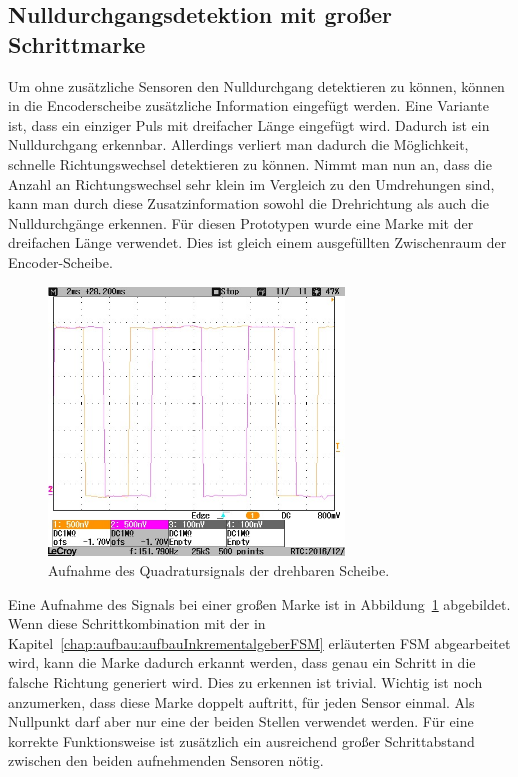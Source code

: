 \subsection{Nulldurchgangsdetektion mit großer Schrittmarke}
\label{chap:aufbau:bigMark}

Um ohne zusätzliche Sensoren den Nulldurchgang detektieren zu können, können in die Encoderscheibe zusätzliche Information eingefügt werden.
Eine Variante ist, dass ein einziger Puls mit dreifacher Länge eingefügt wird.
Dadurch ist ein Nulldurchgang erkennbar.
Allerdings verliert man dadurch die Möglichkeit, schnelle Richtungswechsel detektieren zu können.
Nimmt man nun an, dass die Anzahl an Richtungswechsel sehr klein im Vergleich zu den Umdrehungen sind, kann man durch diese Zusatzinformation sowohl die Drehrichtung als auch die Nulldurchgänge erkennen.
Für diesen Prototypen wurde eine Marke mit der dreifachen Länge verwendet.
Dies ist gleich einem ausgefüllten Zwischenraum der Encoder-Scheibe.

\begin{figure}[!h] \centering
	\includegraphics[width=0.7\textwidth]{img/PicturesPlots/Encoder/BigStep/COPY/CONVERT/SCRN0110_Cutted.jpg}
	\caption{Aufnahme des Quadratursignals der drehbaren Scheibe.}
	\label{fig:quadratureSignalBig}
\end{figure}

Eine Aufnahme des Signals bei einer großen Marke ist in Abbildung~\ref{fig:quadratureSignalBig} abgebildet.
Wenn diese Schrittkombination mit der in Kapitel~\ref{chap:aufbau:aufbauInkrementalgeberFSM} erläuterten FSM abgearbeitet wird, kann die Marke dadurch erkannt werden, dass genau ein Schritt in die falsche Richtung generiert wird.
Dies zu erkennen ist trivial.
Wichtig ist noch anzumerken, dass diese Marke doppelt auftritt, für jeden Sensor einmal.
Als Nullpunkt darf aber nur eine der beiden Stellen verwendet werden.
Für eine korrekte Funktionsweise ist zusätzlich ein ausreichend großer Schrittabstand zwischen den beiden aufnehmenden Sensoren nötig.

